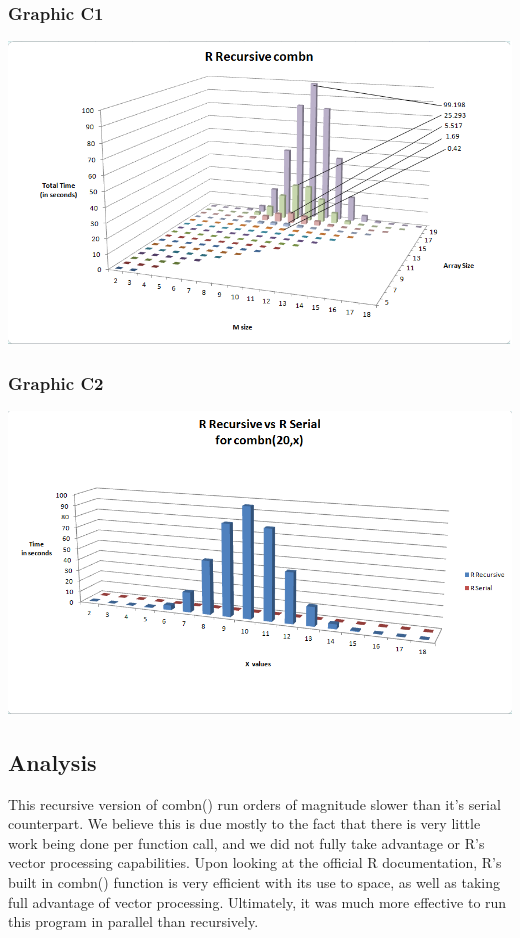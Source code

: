 \documentclass[titlepage, 11pt]{article}
\begin{document}
\subsubsection{Graphic C1}
\includegraphics[scale = 0.5]{images/3D-R} \\
\subsubsection{Graphic C2}
\includegraphics[scale = 0.5]{images/RvsR.png}

\subsection{Analysis}
This recursive version of combn() run orders of magnitude slower than it's serial counterpart. We believe this is due mostly to the fact that there is very little work being done per function call, and we did not fully take advantage or R's vector processing capabilities. Upon looking at the official R documentation, R's built in combn() function is very efficient with its use to space, as well as taking full advantage of vector processing. Ultimately, it was much more effective to run this program in parallel than recursively.
\end{document}
